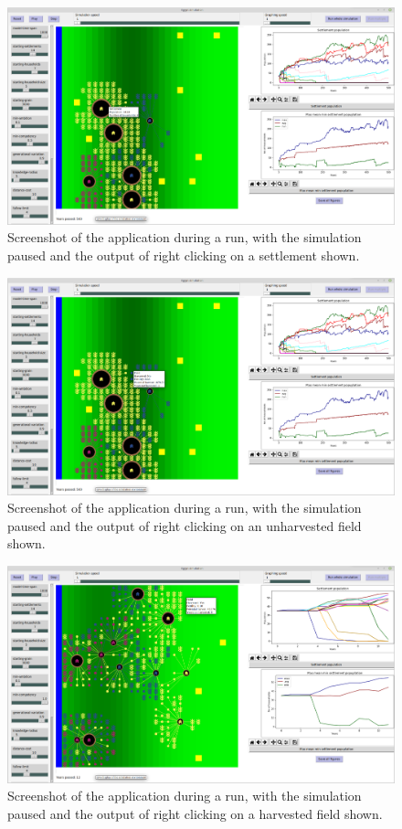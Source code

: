\documentclass[12pt]{article}
\begin{document}
	\begin{figure}[!htb]
		\includegraphics[width=15cm]{RightClickOnSettlement}
		\caption{Screenshot of the application during a run, with the simulation paused and the output of right clicking on a settlement shown.}
		\label{fig:ClickOnSettlement}
	\end{figure}
	
	\begin{figure}[!htb]
		\includegraphics[width=15cm]{RightClickOnNotHarvestedField}
		\caption{Screenshot of the application during a run, with the simulation paused and the output of right clicking on an unharvested field shown.}
		\label{fig:ClickOnUnharvested}
	\end{figure}
	
	\begin{figure}[!htb]
		\includegraphics[width=15cm]{RightClickOnHarvestedField}
		\caption{Screenshot of the application during a run, with the simulation paused and the output of right clicking on a harvested field shown.}
		\label{fig:ClickOnHarvested}
	\end{figure}
	
\end{document}
